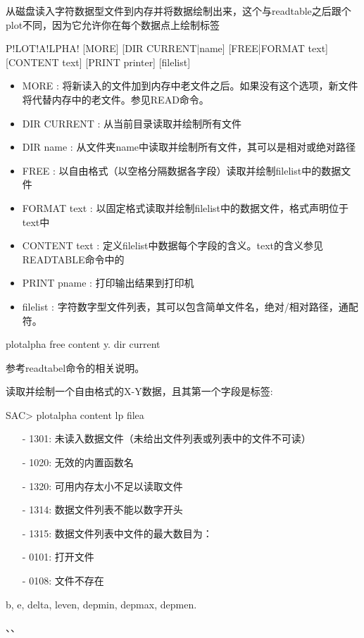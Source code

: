 \label{cmd:plotalpha}

从磁盘读入字符数据型文件到内存并将数据绘制出来，这个与readtable之后跟个plot不同，因为它允许你在每个数据点上绘制标签

\begin{SACSTX}
P!LOT!A!LPHA! [MORE] [DIR CURRENT|name] [FREE|FORMAT text] [CONTENT text] 
    [PRINT printer] [filelist]
\end{SACSTX}

\begin{itemize}
\item MORE : 将新读入的文件加到内存中老文件之后。如果没有这个选项，新文件将代替内存中的老文件。参见READ命令。
\item DIR CURRENT : 从当前目录读取并绘制所有文件 
\item DIR name : 从文件夹name中读取并绘制所有文件，其可以是相对或绝对路径 
\item FREE : 以自由格式（以空格分隔数据各字段）读取并绘制filelist中的数据文件 
\item FORMAT text : 以固定格式读取并绘制filelist中的数据文件，格式声明位于text中 
\item CONTENT text : 定义filelist中数据每个字段的含义。text的含义参见READTABLE命令中的 
\item PRINT pname : 打印输出结果到打印机 
\item filelist : 字符数字型文件列表，其可以包含简单文件名，绝对/相对路径，通配符。 
\end{itemize}

\begin{SACDFT}
plotalpha free content y. dir current
\end{SACDFT}

参考readtabel命令的相关说明。

读取并绘制一个自由格式的X-Y数据，且其第一个字段是标签:
\begin{SACCode}
SAC> plotalpha content lp filea
\end{SACCode}

\begin{itemize}
\item[-]1301: 未读入数据文件（未给出文件列表或列表中的文件不可读）
\item[-]1020: 无效的内置函数名
\item[-]1320: 可用内存太小不足以读取文件
\item[-]1314: 数据文件列表不能以数字开头
\item[-]1315: 数据文件列表中文件的最大数目为：
\end{itemize}

\begin{itemize}
\item[-]0101: 打开文件
\item[-]0108: 文件不存在
\end{itemize}

b, e, delta, leven, depmin, depmax, depmen.

、、

